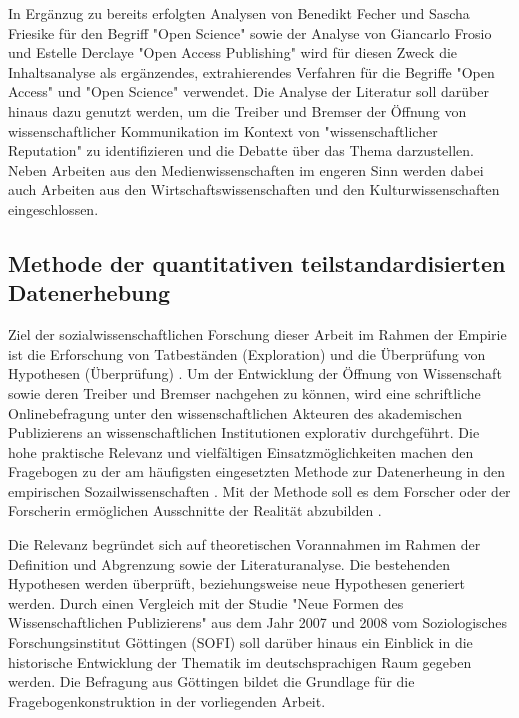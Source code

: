 In Ergänzug zu bereits erfolgten Analysen von Benedikt Fecher und Sascha Friesike für den Begriff "Open Science"\cite{cite:9} sowie der Analyse von Giancarlo Frosio und Estelle Derclaye "Open Access Publishing" \cite{CREATe_2014} wird für diesen Zweck die Inhaltsanalyse als ergänzendes, extrahierendes Verfahren für die Begriffe "Open Access" und "Open Science" verwendet. Die Analyse der Literatur soll darüber hinaus dazu genutzt werden, um die Treiber und Bremser der Öffnung von wissenschaftlicher Kommunikation im Kontext von "wissenschaftlicher Reputation" zu identifizieren und die Debatte über das Thema darzustellen. Neben Arbeiten aus den Medienwissenschaften im engeren Sinn werden dabei auch Arbeiten aus den Wirtschaftswissenschaften und den Kulturwissenschaften eingeschlossen.

\subsection{Methode der quantitativen teilstandardisierten Datenerhebung}

Ziel der sozialwissenschaftlichen Forschung dieser Arbeit im Rahmen der Empirie ist die Erforschung von Tatbeständen (Exploration) und die Überprüfung von Hypothesen (Überprüfung) \cite{raab_2012_fragebogen}. Um der Entwicklung der Öffnung von Wissenschaft sowie deren Treiber und Bremser nachgehen zu können, wird eine schriftliche Onlinebefragung unter den wissenschaftlichen Akteuren des akademischen Publizierens an wissenschaftlichen Institutionen explorativ durchgeführt. Die hohe praktische Relevanz und vielfältigen Einsatzmöglichkeiten machen den Fragebogen zu der am häufigsten eingesetzten Methode zur Datenerheung in den empirischen Sozailwissenschaften \cite{raab_2012_fragebogen}. Mit der Methode soll es dem Forscher oder der Forscherin ermöglichen Ausschnitte der Realität abzubilden \cite{raab_2012_fragebogen}.

Die Relevanz begründet sich auf theoretischen Vorannahmen im Rahmen der Definition und Abgrenzung sowie der Literaturanalyse. Die bestehenden Hypothesen werden überprüft, beziehungsweise neue Hypothesen generiert werden. Durch einen Vergleich mit der Studie "Neue Formen des Wissenschaftlichen Publizierens" aus dem Jahr 2007 und 2008 vom Soziologisches Forschungsinstitut Göttingen (SOFI) soll darüber hinaus ein Einblick in die historische Entwicklung der Thematik im deutschsprachigen Raum gegeben werden. Die Befragung aus Göttingen bildet die Grundlage für die Fragebogenkonstruktion in der vorliegenden Arbeit. 

